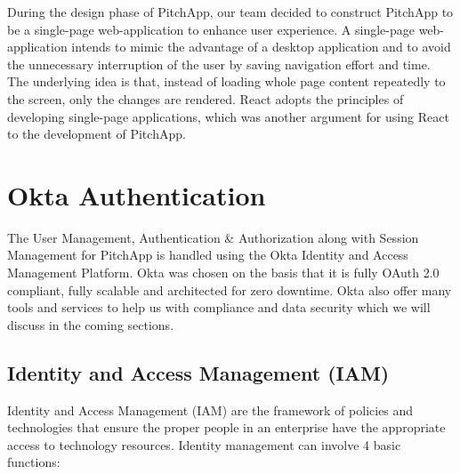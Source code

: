 During the design phase of PitchApp, our team decided to construct PitchApp to be a single-page web-application to enhance user experience. A single-page web-application intends to mimic the advantage of a desktop application and to avoid the unnecessary interruption of the user by saving navigation effort and time. The underlying idea is that, instead of loading whole page content repeatedly to the screen, only the changes are rendered. React adopts the principles of developing single-page applications, which was another argument for using React to the development of PitchApp. 

\section{Okta Authentication}

The User Management, Authentication \& Authorization along with Session Management for PitchApp is handled using the Okta Identity and Access Management Platform. Okta was chosen on the basis that it is fully OAuth 2.0 compliant, fully scalable and architected for zero downtime. Okta also offer many tools and services to help us with compliance and data security which we will discuss in the coming sections.

\subsection{Identity and Access Management (IAM)}

Identity and Access Management (IAM) are the framework of policies and technologies that ensure the proper people in an enterprise have the appropriate access to technology resources. Identity management can involve 4 basic functions:

